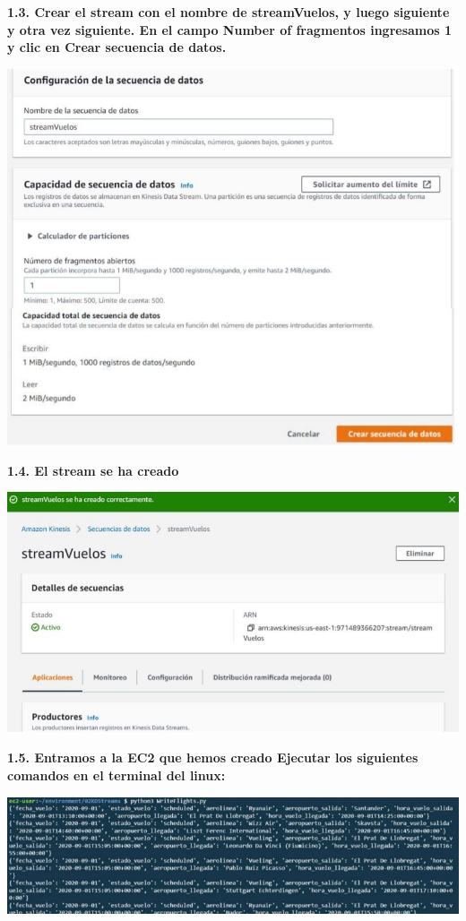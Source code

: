 \documentclass{article}
\begin{document}
\textbf{1.3.  Crear el stream con el nombre de streamVuelos, y luego siguiente y otra vez siguiente.
En el campo Number of fragmentos ingresamos 1 y clic en Crear secuencia de datos.
}

    \begin{center}
		\includegraphics[width=15cm]{./images/2} 
	\end{center}

\newpage
\textbf{1.4.   El stream se ha creado
}

    \begin{center}
		\includegraphics[width=15cm]{./images/3} 
	\end{center}
	
	\newpage
\textbf{1.5.   Entramos a la EC2 que hemos creado
Ejecutar los siguientes comandos en el terminal del linux:
}

    \begin{center}
		\includegraphics[width=15cm]{./images/4} 
	\end{center}
	
\end{document}
